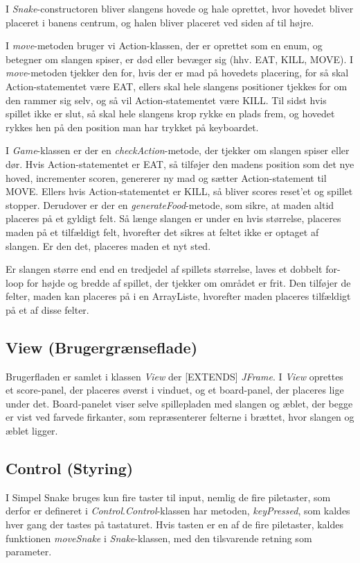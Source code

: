 \documentclass{report}
\begin{document}
I \textit{Snake}-constructoren bliver slangens hovede og hale oprettet, hvor hovedet bliver placeret i banens centrum, og halen bliver placeret ved siden af til højre.

I \textit{move}-metoden bruger vi Action-klassen, der er oprettet som en enum, og betegner om slangen spiser, er død eller bevæger sig (hhv. EAT, KILL, MOVE). I \textit{move}-metoden tjekker den for, hvis der er mad på hovedets placering, for så skal Action-statementet være EAT, ellers skal hele slangens positioner tjekkes for om den rammer sig selv, og så vil Action-statementet være KILL. Til sidst hvis spillet ikke er slut, så skal hele slangens krop rykke en plads frem, og hovedet rykkes hen på den position man har trykket på keyboardet.
\linebreak

I \textit{Game}-klassen er der en \textit{checkAction}-metode, der tjekker om slangen spiser eller dør. Hvis Action-statementet er EAT, så tilføjer den madens position som det nye hoved, incrementer scoren, genererer ny mad og sætter Action-statement til MOVE.
Ellers hvis Action-statementet er KILL, så bliver scores reset'et og spillet stopper.
Derudover er der en \textit{generateFood}-metode, som sikre, at maden altid placeres på et gyldigt felt. Så længe slangen er under en hvis størrelse, placeres maden på et tilfældigt felt, hvorefter det sikres at feltet ikke er optaget af slangen. Er den det, placeres maden et nyt sted.

Er slangen større end end en tredjedel af spillets størrelse, laves et dobbelt for-loop for højde og bredde af spillet, der tjekker om området er frit. Den tilføjer de felter, maden kan placeres på i en ArrayListe, hvorefter maden placeres tilfældigt på et af disse felter.

\subsection{View (Brugergrænseflade)}
Brugerfladen er samlet i klassen \textit{View} der [EXTENDS] \textit{JFrame}. I \textit{View} oprettes et score-panel, der placeres øverst i vinduet, og et board-panel, der placeres lige under det. Board-panelet viser selve spillepladen med slangen og æblet, der begge er vist ved farvede firkanter, som repræsenterer felterne i brættet, hvor slangen og æblet ligger.

\subsection{Control (Styring)}
I Simpel Snake bruges kun fire taster til input, nemlig de fire piletaster, som derfor er defineret i \textit{Control}.\textit{Control}-klassen har metoden, \textit{keyPressed}, som kaldes hver gang der tastes på tastaturet. Hvis tasten er en af de fire piletaster, kaldes funktionen \textit{moveSnake} i \textit{Snake}-klassen, med den tilsvarende retning som parameter.
\end{document}
